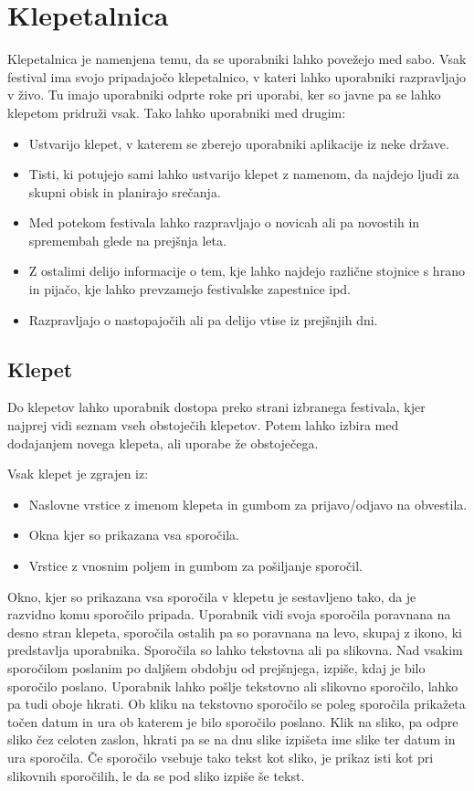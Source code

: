 \documentclass[a4paper,12pt,openright]{book}
\begin{document}
\section{Klepetalnica}
Klepetalnica je namenjena temu, da se uporabniki lahko povežejo med sabo.
Vsak festival ima svojo pripadajočo klepetalnico, v kateri lahko uporabniki razpravljajo v živo.
Tu imajo uporabniki odprte roke pri uporabi, ker so javne pa se lahko klepetom pridruži vsak.
Tako lahko uporabniki med drugim:
\begin{itemize}
    \item Ustvarijo klepet, v katerem se zberejo uporabniki aplikacije iz neke države.
    \item Tisti, ki potujejo sami lahko ustvarijo klepet z namenom, da najdejo ljudi za skupni obisk in planirajo srečanja.
    \item Med potekom festivala lahko razpravljajo o novicah ali pa novostih in spremembah glede na prejšnja leta.
    \item Z ostalimi delijo informacije o tem, kje lahko najdejo različne stojnice s hrano in pijačo, kje lahko prevzamejo festivalske zapestnice ipd.
    \item Razpravljajo o nastopajočih ali pa delijo vtise iz prejšnjih dni.
\end{itemize}

\subsection{Klepet}
Do klepetov lahko uporabnik dostopa preko strani izbranega festivala, kjer najprej vidi seznam vseh obstoječih klepetov.
Potem lahko izbira med dodajanjem novega klepeta, ali uporabe že obstoječega.

Vsak klepet je zgrajen iz:
\begin{itemize}
    \item Naslovne vrstice z imenom klepeta in gumbom za prijavo/odjavo na obvestila.
    \item Okna kjer so prikazana vsa sporočila.
    \item Vrstice z vnosnim poljem in gumbom za pošiljanje sporočil.
\end{itemize}

Okno, kjer so prikazana vsa sporočila v klepetu je sestavljeno tako, da je razvidno komu sporočilo pripada.
Uporabnik vidi svoja sporočila poravnana na desno stran klepeta, sporočila ostalih pa so poravnana na levo, skupaj z ikono, ki predstavlja uporabnika.
Sporočila so lahko tekstovna ali pa slikovna.
Nad vsakim sporočilom poslanim po daljšem obdobju od prejšnjega, izpiše, kdaj je bilo sporočilo poslano.
Uporabnik lahko pošlje tekstovno ali slikovno sporočilo, lahko pa tudi oboje hkrati.
Ob kliku na tekstovno sporočilo se poleg sporočila prikažeta točen datum in ura ob katerem je bilo sporočilo poslano.
Klik na sliko, pa odpre sliko čez celoten zaslon, hkrati pa se na dnu slike izpišeta ime slike ter datum in ura sporočila.
Če sporočilo vsebuje tako tekst kot sliko, je prikaz isti kot pri slikovnih sporočilih, le da se pod sliko izpiše še tekst.
\end{document}

